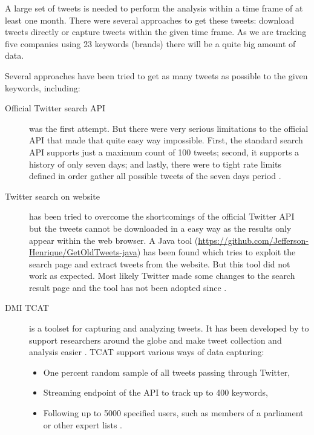 A large set of tweets is needed to perform the analysis within a time frame of at least one month.
There were several approaches to get these tweets: download tweets directly or capture tweets within the given time frame.
As we are tracking five companies using 23 keywords (brands) there will be a quite big amount of data.

Several approaches have been tried to get as many tweets as possible to the given keywords, including:

\begin{description}
  \item [Official Twitter search \ac{API}] 
    was the first attempt.
    But there were very serious limitations to the official \ac{API} that made that quite easy way impossible.
    First, the standard search \ac{API} supports just a maximum count of 100 tweets;
    second, it supports a history of only seven days;
    and lastly, there were to tight rate limits defined in order gather all possible tweets of the seven days period \cite{TwitterInc.2018}.

  \item [Twitter search on website]
    has been tried to overcome the shortcomings of the official Twitter \ac{API} but the tweets cannot be downloaded in a easy way as the results only appear within the web browser.
    A Java tool (\url{https://github.com/Jefferson-Henrique/GetOldTweets-java}) has been found which tries to exploit the search page and extract tweets from the website.
    But this tool did not work as expected.
    Most likely Twitter made some changes to the search result page and the tool has not been adopted since  \cite{Jefferson2016}.

  \item [DMI TCAT]
    is a toolset for capturing and analyzing tweets.
    It has been developed by \citeauthor{Borra2014} to support researchers around the globe and make tweet collection and analysis easier
    \cite{Borra2014}.
    TCAT support various ways of data capturing:
    \begin{itemize}
      \item One percent random sample of all tweets passing through Twitter,
      \item Streaming endpoint of the \ac{API} to track up to 400 keywords,
      \item Following up to 5000 specified users, such as members of a parliament or other expert lists \cite{Borra2014}.
    \end{itemize}

\end{description}

